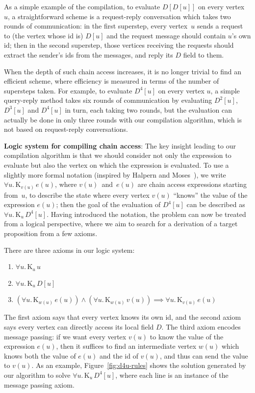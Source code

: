 \documentclass{sokendai_thesis} %
\newcommand{\knows}[2]{\mathrm K_{#1}\,{#2}}
\begin{document}
As a simple example of the compilation, to evaluate $D[D[u]]$ on every vertex~$u$, a straightforward scheme is a request-reply conversation which takes two rounds of communication:
in the first superstep, every vertex~$u$ sends a request to (the vertex whose id is) $D[u]$ and the request message should contain $u$'s own id;
then in the second superstep, those vertices receiving the requests should extract the sender's ids from the messages, and reply its $D$ field to them.

When the depth of such chain access increases, it is no longer trivial to find an efficient scheme, where efficiency is measured in terms of the number of supersteps taken.
For example, to evaluate $D^4[u]$ on every vertex $u$, a simple query-reply method takes six rounds of communication by evaluating $D^2[u]$, $D^3[u]$ and $D^4[u]$ in turn, each taking two rounds, but the evaluation can actually be done in only three rounds with our compilation algorithm, which is not based on request-reply conversations.

\textbf{Logic system for compiling chain access}:
The key insight leading to our compilation algorithm is that we should consider not only the expression to evaluate but also the vertex on which the expression is evaluated.
To use a slightly more formal notation (inspired by Halpern and Moses~\cite{Halpern-common-knowledge}), we write $\forall u.\,\knows{v(u)}{e(u)}$, where $v(u)$~and~$e(u)$ are chain access expressions starting from~$u$, to describe the state where every vertex $v(u)$ ``knows'' the value of the expression $e(u)$; then the goal of the evaluation of $D^4[u]$ can be described as $\forall u.\,\knows{u}{D^4[u]}$.
Having introduced the notation, the problem can now be treated from a logical perspective, where we aim to search for a derivation of a target proposition from a few axioms.

There are three axioms in our logic system:
\begin{enumerate}
\item $\forall u.\,\knows{u}{u}$
\item $\forall u.\,\knows{u}{\mathit{D}[u]}$
\item $(\forall u.\,\knows{w(u)}{e(u)}) \wedge (\forall u.\,\knows{w(u)}{v(u)}) \implies \forall u.\,\knows{v(u)}{e(u)}$
\end{enumerate}
The first axiom says that every vertex knows its own id, and the second axiom says every vertex can directly access its local field $D$.
The third axiom encodes message passing: if we want every vertex $v(u)$ to know the value of the expression $e(u)$, then it suffices to find an intermediate vertex $w(u)$ which knows both the value of $e(u)$ and the id of $v(u)$, and thus can send the value to $v(u)$.
As an example, Figure~\ref{fig:d4u-rules} shows the solution generated by our algorithm to solve $\forall u.\,\knows{u}{D^4[u]}$, where each line is an instance of the message passing axiom.
\end{document}
